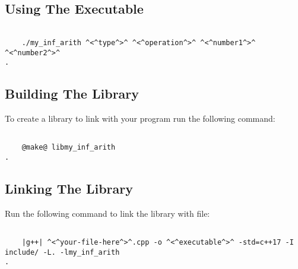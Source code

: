 \subsection{Using The Executable}

\begin{lstlisting}[style=terminal]

	./my_inf_arith ^<^type^>^ ^<^operation^>^ ^<^number1^>^ ^<^number2^>^
.
\end{lstlisting}

\subsection{Building The Library}
To create a library to link with your program run the following command:
\begin{lstlisting}[style=terminal]

	@make@ libmy_inf_arith
.
\end{lstlisting}


\subsection{Linking The Library}
Run the following command to link the library with file:
\begin{lstlisting}[style=terminal]

	|g++| ^<^your-file-here^>^.cpp -o ^<^executable^>^ -std=c++17 -I include/ -L. -lmy_inf_arith
.
\end{lstlisting}